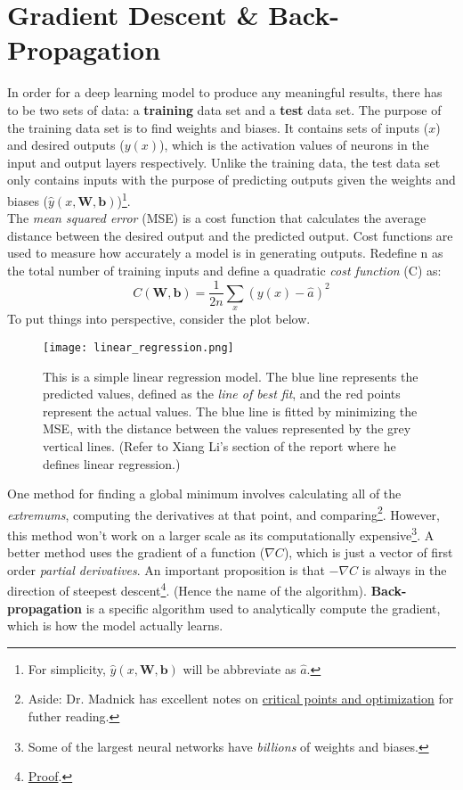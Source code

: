 \documentclass[12pt]{article}
\begin{document}
\section*{Gradient Descent \& Back-Propagation}
In order for a deep learning model to produce any meaningful results, there has to be two sets of data: a \textbf{training} data set and a \textbf{test} data set. The purpose of the training data set is to find weights and biases. It contains sets of inputs ($x$) and desired outputs ($y(x)$), which is the activation values of neurons in the input and output layers respectively. Unlike the training data, the test data set only contains inputs with the purpose of predicting outputs given the weights and biases ($\hat{y}(x,\bm{W},\bm{b})$)\footnote{For simplicity, $\hat{y}(x,\bm{W},\bm{b})$ will be abbreviate as $\hat{a}$.  }\cite{nielsen2015NN}.\\
\newline
The \textit{mean squared error} (MSE) is a cost function that calculates the average distance between the desired output and the predicted output. Cost functions are used to measure how accurately a model is in generating outputs. Redefine n as the total number of training inputs and define a quadratic \textit{cost function} (C) as\cite{nielsen2015NN}:
\begin{equation}\label{MSE}
    C(\bm{W},\bm{b}) = \frac{1}{2n}\sum_x(y(x)-\hat{a})^2
\end{equation}
To put things into perspective, consider the plot below.
\newpage
\begin{figure}[h]
    \centering
    \texttt{[image: linear\_regression.png]}
    \caption{This is a simple linear regression model\cite{james2013introduction}. The blue line represents the predicted values, defined as the \textit{line of best fit}, and the red points represent the actual values. The blue line is fitted by minimizing the MSE, with the distance between the values represented by the grey vertical lines.  (Refer to Xiang Li's section of the report where he defines linear regression.)}
\end{figure}
One method for finding a global minimum involves calculating all of the \textit{extremums}, computing the derivatives at that point, and comparing\footnote{Aside: Dr. Madnick has excellent notes on \href{https://sites.google.com/view/2xx3-winter20/unit-ii/chapter-5/sections-5-3-5-4?authuser=0}{critical points and optimization} for futher reading.}. However, this method won't work on a larger scale as its computationally expensive\footnote{Some of the largest neural networks have \emph{billions} of weights and biases\cite{nielsen2015NN}.}. A better method uses the gradient of a function ($\nabla C$), which is just a vector of first order \textit{partial derivatives}. An important proposition is that $-\nabla C$ is always in the direction of steepest descent\footnote{\href{https://youtu.be/TEB2z7ZlRAw}{Proof}.}. (Hence the name of the algorithm). \textbf{Back-propagation} is a specific algorithm used to analytically compute the gradient, which is how the model actually learns.
\end{document}
